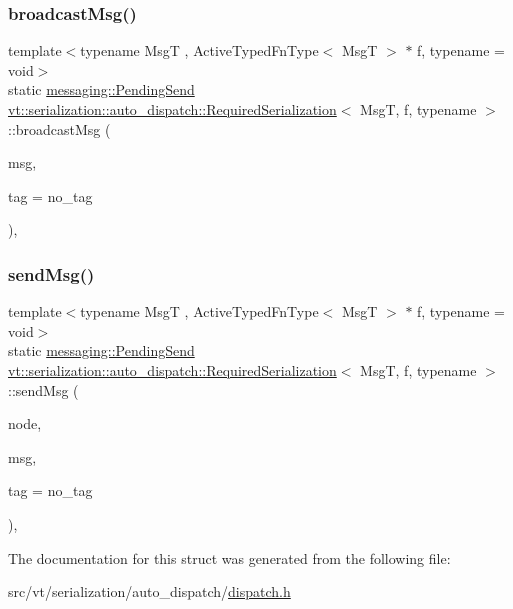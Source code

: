 \subsubsection{\texorpdfstring{broadcast\+Msg()}{broadcastMsg()}}
{\footnotesize\ttfamily template$<$typename MsgT , Active\+Typed\+Fn\+Type$<$ Msg\+T $>$ $\ast$ f, typename  = void$>$ \\
static \hyperlink{structvt_1_1messaging_1_1_pending_send}{messaging\+::\+Pending\+Send} \hyperlink{structvt_1_1serialization_1_1auto__dispatch_1_1_required_serialization}{vt\+::serialization\+::auto\+\_\+dispatch\+::\+Required\+Serialization}$<$ MsgT, f, typename $>$\+::broadcast\+Msg (\begin{DoxyParamCaption}\item[{MsgT $\ast$}]{msg,  }\item[{\hyperlink{namespacevt_a84ab281dae04a52a4b243d6bf62d0e52}{Tag\+Type} const \&}]{tag = {\ttfamily no\+\_\+tag} }\end{DoxyParamCaption})\hspace{0.3cm}{\ttfamily [inline]}, {\ttfamily [static]}}

\mbox{\label{structvt_1_1serialization_1_1auto__dispatch_1_1_required_serialization_a739f57acd49730073734dac89231d8bb}} 
\subsubsection{\texorpdfstring{send\+Msg()}{sendMsg()}}
{\footnotesize\ttfamily template$<$typename MsgT , Active\+Typed\+Fn\+Type$<$ Msg\+T $>$ $\ast$ f, typename  = void$>$ \\
static \hyperlink{structvt_1_1messaging_1_1_pending_send}{messaging\+::\+Pending\+Send} \hyperlink{structvt_1_1serialization_1_1auto__dispatch_1_1_required_serialization}{vt\+::serialization\+::auto\+\_\+dispatch\+::\+Required\+Serialization}$<$ MsgT, f, typename $>$\+::send\+Msg (\begin{DoxyParamCaption}\item[{\hyperlink{namespacevt_a866da9d0efc19c0a1ce79e9e492f47e2}{Node\+Type} const \&}]{node,  }\item[{MsgT $\ast$}]{msg,  }\item[{\hyperlink{namespacevt_a84ab281dae04a52a4b243d6bf62d0e52}{Tag\+Type} const \&}]{tag = {\ttfamily no\+\_\+tag} }\end{DoxyParamCaption})\hspace{0.3cm}{\ttfamily [inline]}, {\ttfamily [static]}}



The documentation for this struct was generated from the following file\+:\begin{DoxyCompactItemize}
\item 
src/vt/serialization/auto\+\_\+dispatch/\hyperlink{serialization_2auto__dispatch_2dispatch_8h}{dispatch.\+h}\end{DoxyCompactItemize}
